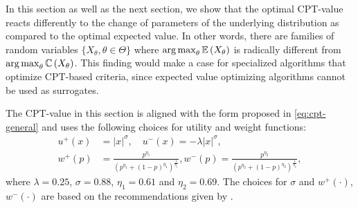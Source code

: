In this section as well as the next section, we show that the optimal CPT-value reacts differently to the change of parameters of the underlying distribution as compared to the optimal expected value. In other words,  there are families of random variables $\{X_\theta, \theta \in \Theta\}$ where $\mathop{\rm arg\,max}_{\theta} \mathbb{E}\left( X_\theta \right)$ is radically different from 
$\mathop{\rm arg\,max}_{\theta} \mathbb{C} \left( X_\theta \right)$. This finding would make a case for specialized algorithms that optimize CPT-based criteria, since expected value optimizing algorithms cannot be used as surrogates. 

The CPT-value in this section is aligned with the form proposed in \eqref{eq:cpt-general} and uses the following choices for utility and weight functions:
\begin{align*}
u^+(x) &=  |x|^{\sigma}, \quad u^-(x) = -\lambda |x|^{\sigma},\\
w^+(p) &= \frac{p^{\eta_1}}{{(p^{\eta_1}+ (1-p)^{\eta_1})}^{\frac{1}{\eta_1}}}, w^-(p) = \frac{p^{\eta_2}}{{(p^{\eta_2}+ (1-p)^{\eta_2})}^{\frac{1}{\eta_2}}},
\end{align*} 
where $\lambda = 0.25$, $\sigma = 0.88$, $\eta_1 = 0.61$ and $\eta_2 = 0.69$. The choices for $\sigma$ and $w^+(\cdot)$,  $w^-(\cdot)$ are based on the recommendations given by \cite{tversky1992advances}. 

